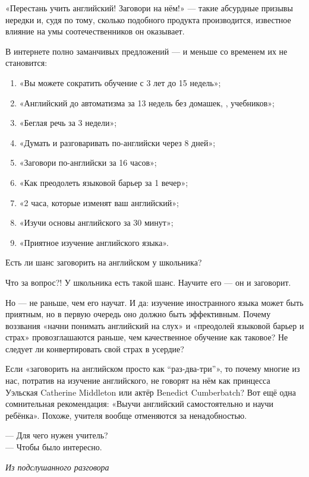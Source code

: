 «Перестань учить английский! Заговори на нём!» --- такие абсурдные призывы нередки и, судя по тому, сколько подобного продукта производится, известное влияние на умы соотечественников он оказывает.

В интернете полно заманчивых предложений --- и меньше со временем их не становится:

\begin{enumerate}
    \item «Вы можете сократить обучение с 3 лет до 15 недель»;
    \item «Английский до автоматизма за 13 недель без домашек, , учебников»;
    \item «Беглая речь за 3 недели»;
    \item «Думать и разговаривать по-английски через 8 дней»;
    \item «Заговори по-английски за 16 часов»;
    \item «Как преодолеть языковой барьер за 1 вечер»;
    \item «2 часа, которые изменят ваш английский»;
    \item «Изучи основы английского за 30 минут»;
    \item «Приятное изучение английского языка».
\end{enumerate}

Есть ли шанс заговорить на английском у школьника?

Что за вопрос?! У школьника есть такой шанс. Научите его --- он и заговорит.

Но ---  не раньше, чем его научат. И да: изучение иностранного языка может быть приятным, но в первую очередь оно должно быть эффективным. Почему воззвания «начни понимать английский на слух» и «преодолей языковой барьер и страх» провозглашаются раньше, чем качественное обучение как таковое? Не следует ли конвертировать свой страх в усердие?

Если «заговорить на английском просто как ``раз-два-три''», то почему многие из нас, потратив  на изучение английского, не говорят на нём как принцесса Уэльская Catherine Middleton или актёр Benedict Cumberbatch? Вот ещё одна сомнительная рекомендация: «Выучи английский самостоятельно и научи ребёнка». Похоже, учителя вообще отменяются за ненадобностью.

\begin{fancyquotes}
    --- Для чего нужен учитель?\\
    --- Чтобы было интересно.\\

    \begin{flushright}
        \it Из подслушанного разговора
    \end{flushright}
\end{fancyquotes}

